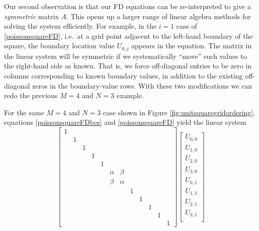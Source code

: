 Our second observation is that our FD equations can be re-interpreted to give a \emph{symmetric} matrix $A$.  This opens up a larger range of linear algebra methods for solving the system efficiently.  For example, in the $i=1$ case of \eqref{poissonsquareFD}, i.e.~at a grid point adjacent to the left-hand boundary of the square, the boundary location value $U_{0,j}$ appears in the equation.  The matrix in the linear system will be symmetric if we systematically ``move'' such values to the right-hand side as known.  That is, we force off-diagonal entries to be zero in columns corresponding to known boundary values, in addition to the existing off-diagonal zeros in the boundary-value rows.  With these two modifications we can redo the previous $M=4$ and $N=3$ example.

\medskip\noindent\hrulefill
\begin{example} For the same $M=4$ and $N=3$ case shown in Figure \ref{fig:unitsquaregridordering}, equations \eqref{poissonsquareFDbcs} and \eqref{poissonsquareFD} yield the linear system
\begin{equation*}
\begin{bmatrix}
1 &  &  &  &  &  &  &  &  &  &  &  \\
  & 1&  &  &  &  &  &  &  &  &  &  \\
  &  & 1&  &  &  &  &  &  &  &  &  \\
  &  &  & 1&  &  &  &  &  &  &  &  \\
  &  &  &  & 1&  &  &  &  &  &  &  \\
  &  &  &  &  & \alpha& \beta&  &  &  &  &  \\
  &  &  &  &  & \beta& \alpha&  &  &  &  &  \\
  &  &  &  &  &  &  & 1&  &  &  &  \\
  &  &  &  &  &  &  &  & 1&  &  &  \\
  &  &  &  &  &  &  &  &  & 1&  &  \\
  &  &  &  &  &  &  &  &  &  & 1&  \\
  &  &  &  &  &  &  &  &  &  &  & 1
\end{bmatrix}
\begin{bmatrix}
U_{0,0} \\
U_{1,0} \\
U_{2,0} \\
U_{3,0} \\
U_{0,1} \\
U_{1,1} \\
U_{2,1} \\
U_{3,1} \\

\end{bmatrix}
\end{equation*}
\end{example}
